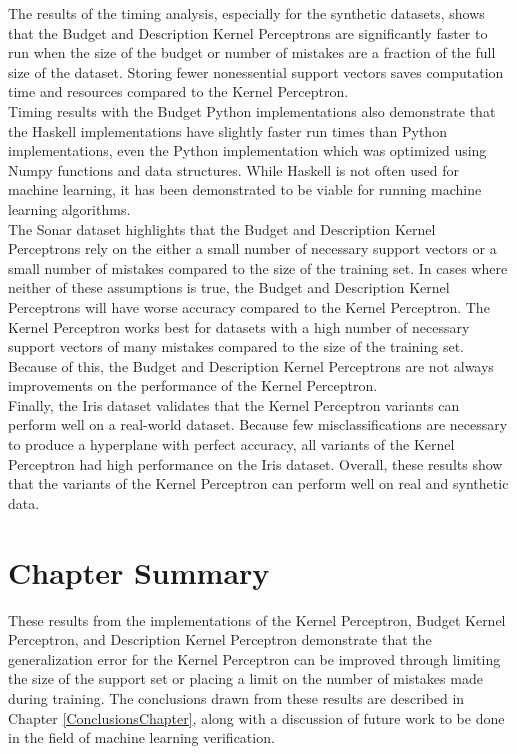 The results of the timing analysis, especially for the synthetic datasets, shows that the Budget and Description Kernel Perceptrons are significantly faster to run when the size of the budget or number of mistakes are a fraction of the full size of the dataset. Storing fewer nonessential support vectors saves computation time and resources compared to the Kernel Perceptron.
\\Timing results with the Budget Python implementations also demonstrate that the Haskell implementations have slightly faster run times than Python implementations, even the Python implementation which was optimized using Numpy functions and data structures. While Haskell is not often used for machine learning, it has been demonstrated to be viable for running machine learning algorithms. 
\\The Sonar dataset highlights that the Budget and Description Kernel Perceptrons rely on the either a small number of necessary support vectors or a small number of mistakes compared to the size of the training set. In cases where neither of these assumptions is true, the Budget and Description Kernel Perceptrons will have worse accuracy compared to the Kernel Perceptron. The Kernel Perceptron works best for datasets with a high number of necessary support vectors of many mistakes compared to the size of the training set. Because of this, the Budget and Description Kernel Perceptrons are not always improvements on the performance of the Kernel Perceptron.
\\Finally, the Iris dataset validates that the Kernel Perceptron variants can perform well on a real-world dataset. Because few misclassifications are necessary to produce a hyperplane with perfect accuracy, all variants of the Kernel Perceptron had high performance on the Iris dataset. Overall, these results show that the variants of the Kernel Perceptron can perform well on real and synthetic data.
\section{Chapter Summary}\label{ResultsChapterSummarySection}
These results from the implementations of the Kernel Perceptron, Budget Kernel Perceptron, and Description Kernel Perceptron demonstrate that the generalization error for the Kernel Perceptron can be improved through limiting the size of the support set or placing a limit on the number of mistakes made during training. The conclusions drawn from these results are described in Chapter \ref{ConclusionsChapter}, along with a discussion of future work to be done in the field of machine learning verification.

